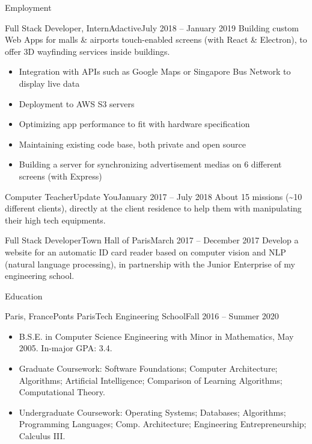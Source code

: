 \documentclass[]{mcdowellcv}
\begin{document}
	\makeheader

	\begin{cvsection}{Employment}
		\begin{cvsubsection}{Full Stack Developer, Intern}{Adactive}{July 2018 -- January 2019}
            Building custom Web Apps for malls \& airports touch-enabled screens (with React \& Electron), to offer 3D wayfinding services inside buildings.
            \begin{itemize}
                \item Integration with APIs such as Google Maps or Singapore Bus Network to display live data
                \item Deployment to AWS S3 servers
                \item Optimizing app performance to fit with hardware specification
                \item Maintaining existing code base, both private and open source
                \item Building a server for synchronizing advertisement medias on 6 different screens (with Express)
			\end{itemize}
		\end{cvsubsection}

		\begin{cvsubsection}{Computer Teacher}{Update You}{January 2017 -- July 2018}
            About 15 missions (\textasciitilde 10 different clients), directly at the client residence to help them with manipulating their high tech equipments.
		\end{cvsubsection}

		\begin{cvsubsection}{Full Stack Developer}{Town Hall of Paris}{March 2017 -- December 2017}
            Develop a website for an automatic ID card reader based on computer vision and NLP (natural language processing), in partnership with the Junior Enterprise of my engineering school.
		\end{cvsubsection}

	\end{cvsection}

	\begin{cvsection}{Education}
		\begin{cvsubsection}{Paris, France}{Ponts ParisTech Engineering School}{Fall 2016 -- Summer 2020}
			\begin{itemize}
				\item B.S.E. in Computer Science Engineering with Minor in Mathematics, May 2005.  In-major GPA: 3.4.
				\item Graduate Coursework: Software Foundations; Computer Architecture; Algorithms; Artificial Intelligence; Comparison of Learning Algorithms; Computational Theory.
				\item Undergraduate Coursework: Operating Systems; Databases; Algorithms; Programming Languages; Comp. Architecture; Engineering Entrepreneurship; Calculus III.
			\end{itemize}
		\end{cvsubsection}
	\end{cvsection}
\end{document}

